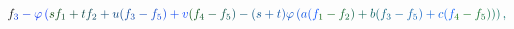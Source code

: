 \documentclass[12pt]{article}
\begin{document}
\begin{displaymath}
{f} _ { \mathcolor[RGB]{0,45,210}{3} } \mathcolor[RGB]{0,45,225}{-} \mathcolor[RGB]{0,45,240}{\varphi} \mathcolor[RGB]{0,45,255}{\left(} \mathcolor[RGB]{0,60,0}{s} \mathcolor[RGB]{0,60,15}{f} _ { \mathcolor[RGB]{0,60,30}{1} } \mathcolor[RGB]{0,60,45}{+} \mathcolor[RGB]{0,60,60}{t} \mathcolor[RGB]{0,60,75}{f} _ { \mathcolor[RGB]{0,60,90}{2} } \mathcolor[RGB]{0,60,105}{+} \mathcolor[RGB]{0,60,120}{u} \mathcolor[RGB]{0,60,135}{(} \mathcolor[RGB]{0,60,150}{f} _ { \mathcolor[RGB]{0,60,165}{3} } \mathcolor[RGB]{0,60,180}{-} \mathcolor[RGB]{0,60,195}{f} _ { \mathcolor[RGB]{0,60,210}{5} } \mathcolor[RGB]{0,60,225}{)} \mathcolor[RGB]{0,60,240}{+} \mathcolor[RGB]{0,60,255}{v} \mathcolor[RGB]{0,75,0}{(} \mathcolor[RGB]{0,75,15}{f} _ { \mathcolor[RGB]{0,75,30}{4} } \mathcolor[RGB]{0,75,45}{-} \mathcolor[RGB]{0,75,60}{f} _ { \mathcolor[RGB]{0,75,75}{5} } \mathcolor[RGB]{0,75,90}{)} \mathcolor[RGB]{0,75,105}{-} \mathcolor[RGB]{0,75,120}{(} \mathcolor[RGB]{0,75,135}{s} \mathcolor[RGB]{0,75,150}{+} \mathcolor[RGB]{0,75,165}{t} \mathcolor[RGB]{0,75,180}{)} \mathcolor[RGB]{0,75,195}{\varphi} \mathcolor[RGB]{0,75,210}{\left(} \mathcolor[RGB]{0,75,225}{a} \mathcolor[RGB]{0,75,240}{(} \mathcolor[RGB]{0,75,255}{f} _ { \mathcolor[RGB]{0,90,0}{1} } \mathcolor[RGB]{0,90,15}{-} \mathcolor[RGB]{0,90,30}{f} _ { \mathcolor[RGB]{0,90,45}{2} } \mathcolor[RGB]{0,90,60}{)} \mathcolor[RGB]{0,90,75}{+} \mathcolor[RGB]{0,90,90}{b} \mathcolor[RGB]{0,90,105}{(} \mathcolor[RGB]{0,90,120}{f} _ { \mathcolor[RGB]{0,90,135}{3} } \mathcolor[RGB]{0,90,150}{-} \mathcolor[RGB]{0,90,165}{f} _ { \mathcolor[RGB]{0,90,180}{5} } \mathcolor[RGB]{0,90,195}{)} \mathcolor[RGB]{0,90,210}{+} \mathcolor[RGB]{0,90,225}{c} \mathcolor[RGB]{0,90,240}{(} \mathcolor[RGB]{0,90,255}{f} _ { \mathcolor[RGB]{0,105,0}{4} } \mathcolor[RGB]{0,105,15}{-} \mathcolor[RGB]{0,105,30}{f} _ { \mathcolor[RGB]{0,105,45}{5} } \mathcolor[RGB]{0,105,60}{)} \mathcolor[RGB]{0,105,75}{\right)} \mathcolor[RGB]{0,105,90}{\right)} \mathcolor[RGB]{0,105,105}{,} \mathcolor[RGB]{0,105,120}{\,
}
\end{displaymath}
\end{document}
